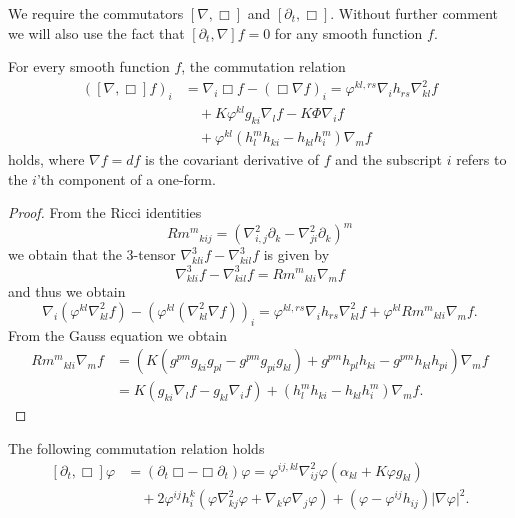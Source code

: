 \documentclass[12pt]{amsart}
\begin{document}
We require the commutators \([\nabla, \Box]\) and \([\partial_t, \Box]\). Without further comment we will also use the fact that \([\partial_t, \nabla] f = 0\) for any smooth function \(f\).

\begin{lemma}
\label{lem:gradBox}
For every smooth function $f$, the commutation relation
\[
\begin{split}
([\nabla, \Box]f)_i &= \nabla_i \Box f - (\Box \nabla f)_i = \varphi^{kl,rs} \nabla_i h_{rs} \nabla^2_{kl} f \\
&\quad + K \varphi^{kl} g_{ki} \nabla_l f - K \Phi \nabla_i f \\
&\quad + \varphi^{kl}\left(h^{m}_{l}h_{ki} - h_{kl}h^{m}_{i}\right) \nabla_m f
\end{split}
\]
holds, where \(\nabla f = df\) is the covariant derivative of \(f\) and the subscript \(i\) refers to the \(i\)'th component of a one-form.
\end{lemma}

\begin{proof}
From the Ricci identities
\[
{Rm^m}_{kij}  = \left(\nabla^2_{i, j} \partial_k - \nabla^2_{ji} \partial_k\right)^m
\]
we obtain that the $3$-tensor $\nabla^3_{kli}f-\nabla^3_{kil}f$
is given by
\[
\nabla^3_{kli}f-\nabla^3_{kil}f={Rm^m}_{kli}\nabla_m f
\]
and thus we obtain
\[
\nabla_i (\varphi^{kl} \nabla^2_{kl} f) - (\varphi^{kl}(\nabla^2_{kl} \nabla f))_i = \varphi^{kl,rs} \nabla_i h_{rs} \nabla^2_{kl}f + \varphi^{kl}{Rm^{m}}_{kli} \nabla_m f.
\]
From the Gauss equation we obtain
\[
\begin{split}
{Rm^{m}}_{kli} \nabla_m f &= \left(K\left(g^{pm}g_{ki}g_{pl}  - g^{pm}g_{pi}g_{kl}\right) + g^{pm} h_{pl}h_{ki} - g^{pm}h_{kl}h_{pi}\right) \nabla_m f \\
&= K\left(g_{ki} \nabla_l f - g_{kl} \nabla_i f\right) + \left(h^{m}_{l}h_{ki} - h_{kl}h^{m}_{i}\right) \nabla_m f.
\end{split}
\]
\end{proof}

\begin{lemma}
\label{lem:deltBox}
The following commutation relation holds
\[
\begin{split}
[\partial_t, \Box] \varphi &= (\partial_{t}\Box - \Box\partial_{t}) \varphi = \varphi^{ij,kl} \nabla^2_{ij} \varphi (\alpha_{kl} + K \varphi g_{kl}) \\
&\quad + 2\varphi^{ij}h^{k}_{i} (\varphi \nabla^2_{k
j} \varphi + \nabla_k \varphi \nabla_j \varphi) + (\varphi - \varphi^{ij}h_{ij})| \nabla\varphi|^{2}.
\end{split}
\]
\end{lemma}
\end{document}
